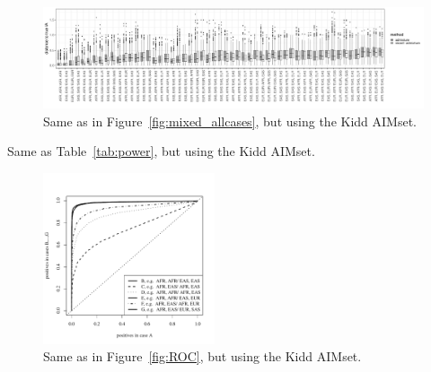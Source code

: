 \documentclass[12pt]{article}
\theoremstyle{definition}
\begin{document}
\begin{figure}
  \centering
  \includegraphics[width=\textwidth]{deviations_mixed_allcases_Kidd.pdf}
  \caption{Same as in Figure~\ref{fig:mixed_allcases}, but using the
    Kidd AIMset.}
  \label{fig:mixed_allcases_Kidd}
\end{figure}

\begin{table}
  \centering
  
  \caption{Same as Table~\ref{tab:power}, but using the Kidd AIMset.}
  \label{tab:power_Kidd}
\end{table}

\begin{figure}[htb]
  \begin{center}
    \includegraphics[width=0.45\textwidth]{roc-curve-Kidd.pdf}
  \end{center}
  \caption{Same as in Figure~\ref{fig:ROC}, but using the Kidd
    AIMset.}
  \label{fig:ROC_Kidd} 
\end{figure}
\end{document}
